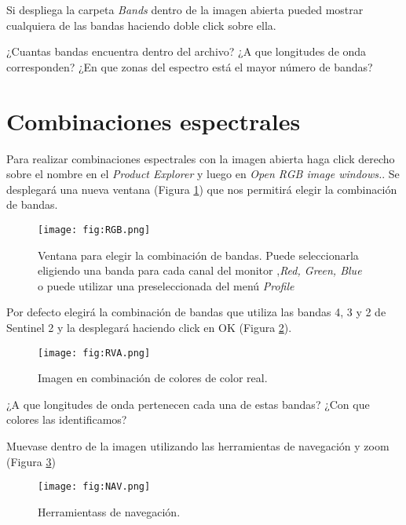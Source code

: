 Si despliega la carpeta \emph{Bands} dentro de la imagen abierta pueded mostrar cualquiera de las bandas haciendo doble click sobre ella.

\begin{que}
    ¿Cuantas bandas encuentra dentro del archivo? ¿A que longitudes de onda corresponden? ¿En que zonas del espectro está el mayor número de bandas?
\end{que}

\section{Combinaciones espectrales}

Para realizar combinaciones espectrales con la imagen abierta haga click derecho sobre el nombre en el \emph{Product Explorer} y luego en \emph{Open RGB image windows.}. Se desplegará una nueva ventana (Figura \ref{fig:RGB}) que nos permitirá elegir la combinación de bandas.

\begin{figure}[h!]
    \centering
    \texttt{[image: fig:RGB.png]}
    \caption{Ventana para elegir la combinación de bandas. Puede seleccionarla eligiendo una banda para cada canal del monitor ,\emph{Red, Green, Blue} o puede utilizar una preseleccionada del menú \emph{Profile}}
    \label{fig:RGB}
\end{figure}

Por defecto elegirá la combinación de bandas que utiliza las bandas 4, 3 y 2 de Sentinel 2 y la desplegará haciendo click en OK (Figura \ref{fig:RVA}).

\begin{figure}[h!]
    \centering
    \texttt{[image: fig:RVA.png]}
    \caption{Imagen en combinación de colores de color real.}
    \label{fig:RVA}
\end{figure}

\begin{que}
    ¿A que longitudes de onda pertenecen cada una de estas bandas? ¿Con que colores las identificamos?
\end{que}

Muevase dentro de la imagen utilizando las herramientas de navegación y zoom (Figura \ref{fig:NAV})

\begin{figure}[h!]
    \centering
    \texttt{[image: fig:NAV.png]}
    \caption{Herramientass de navegación.}
    \label{fig:NAV}
\end{figure}

